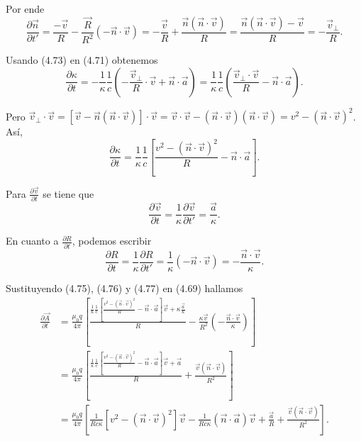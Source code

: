 \documentclass[12pt,a4paper]{book}
\begin{document}
Por ende
\begin{equation}
\frac{\partial\vec{n}}{\partial t'} = \frac{-\vec{v}}{R} - \frac{\vec{R}}{R^2}(-\vec{n} \cdot \vec{v}) = -\frac{\vec{v}}{R} + \frac{\vec{n}(\vec{n} \cdot \vec{v})}{R} = \frac{\vec{n}(\vec{n} \cdot \vec{v}) - \vec{v}}{R} = -\frac{\vec{v}_{\perp}}{R}.
\end{equation}

Usando (4.73) en (4.71) obtenemos
\begin{equation}
\frac{\partial\kappa}{\partial t} = -\frac{1}{\kappa}\frac{1}{c}\left(-\frac{\vec{v}_{\perp}}{R} \cdot \vec{v} + \vec{n} \cdot \vec{a}\right) = \frac{1}{\kappa}\frac{1}{c}\left(\frac{\vec{v}_{\perp} \cdot \vec{v}}{R} - \vec{n} \cdot \vec{a}\right).
\end{equation}

Pero $\vec{v}_{\perp} \cdot \vec{v} = [\vec{v} - \vec{n}(\vec{n} \cdot \vec{v})] \cdot \vec{v} = \vec{v} \cdot \vec{v} - (\vec{n} \cdot \vec{v})(\vec{n} \cdot \vec{v}) = v^2 - (\vec{n} \cdot \vec{v})^2$. Así,
\begin{equation}
\frac{\partial\kappa}{\partial t} = \frac{1}{\kappa}\frac{1}{c}\left[\frac{v^2 - (\vec{n} \cdot \vec{v})^2}{R} - \vec{n} \cdot \vec{a}\right].
\end{equation}

Para $\frac{\partial\vec{v}}{\partial t}$ se tiene que
\begin{equation}
\frac{\partial\vec{v}}{\partial t} = \frac{1}{\kappa}\frac{\partial\vec{v}}{\partial t'} = \frac{\vec{a}}{\kappa}.
\end{equation}

En cuanto a $\frac{\partial R}{\partial t}$, podemos escribir
\begin{equation}
\frac{\partial R}{\partial t} = \frac{1}{\kappa}\frac{\partial R}{\partial t'} = \frac{1}{\kappa}(-\vec{n} \cdot \vec{v}) = -\frac{\vec{n} \cdot \vec{v}}{\kappa}.
\end{equation}

Sustituyendo (4.75), (4.76) y (4.77) en (4.69) hallamos
\begin{align}
\frac{\partial\vec{A}}{\partial t} &= \frac{\mu_0 q}{4\pi}\left[\frac{\frac{1}{\kappa}\frac{1}{c}\left[\frac{v^2 - (\vec{n} \cdot \vec{v})^2}{R} - \vec{n} \cdot \vec{a}\right]\vec{v} + \kappa\frac{\vec{a}}{\kappa}}{R} - \frac{\kappa\vec{v}}{R^2}\left(-\frac{\vec{n} \cdot \vec{v}}{\kappa}\right)\right] \nonumber \\
&= \frac{\mu_0 q}{4\pi}\left[\frac{\frac{1}{\kappa}\frac{1}{c}\left[\frac{v^2 - (\vec{n} \cdot \vec{v})^2}{R} - \vec{n} \cdot \vec{a}\right]\vec{v} + \vec{a}}{R} + \frac{\vec{v}(\vec{n} \cdot \vec{v})}{R^2}\right] \nonumber \\
&= \frac{\mu_0 q}{4\pi}\left[\frac{1}{Rc\kappa}[v^2 - (\vec{n} \cdot \vec{v})^2]\vec{v} - \frac{1}{Rc\kappa}(\vec{n} \cdot \vec{a})\vec{v} + \frac{\vec{a}}{R} + \frac{\vec{v}(\vec{n} \cdot \vec{v})}{R^2}\right].
\end{align}
\end{document}
